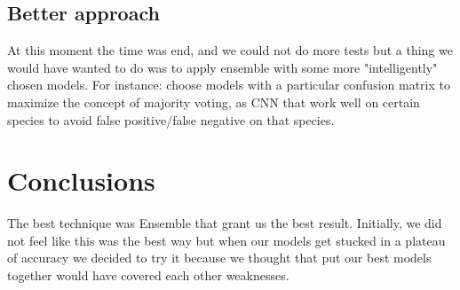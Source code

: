 \documentclass[11pt]{article}
\begin{document}
\subsection{Better approach}
At this moment the time was end, and we could not do more tests but a thing we would have wanted to do was to apply ensemble with some more "intelligently" chosen models.
For instance: choose models with a particular confusion matrix to maximize the concept of majority voting, as CNN that work well on certain species to avoid false positive/false negative on that species.

\section{Conclusions}
The best technique was Ensemble that grant us the best result.
Initially, we did not feel like this was the best way but when our models get stucked in a plateau of accuracy
we decided to try it because we thought that put our best models together would have covered each other weaknesses.

\end{document}
